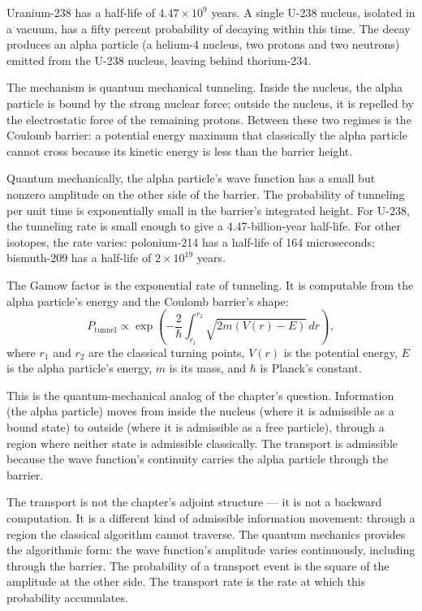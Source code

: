 Uranium-238 has a half-life of $4.47 \times 10^9$ years. A single
U-238 nucleus, isolated in a vacuum, has a fifty percent probability
of decaying within this time. The decay produces an alpha particle (a
helium-4 nucleus, two protons and two neutrons) emitted from the U-238
nucleus, leaving behind thorium-234.

The mechanism is quantum mechanical tunneling. Inside the nucleus,
the alpha particle is bound by the strong nuclear force; outside the
nucleus, it is repelled by the electrostatic force of the remaining
protons. Between these two regimes is the Coulomb barrier: a
potential energy maximum that classically the alpha particle cannot
cross because its kinetic energy is less than the barrier height.

Quantum mechanically, the alpha particle's wave function has a small
but nonzero amplitude on the other side of the barrier. The
probability of tunneling per unit time is exponentially small in the
barrier's integrated height. For U-238, the tunneling rate is small
enough to give a 4.47-billion-year half-life. For other isotopes,
the rate varies: polonium-214 has a half-life of 164 microseconds;
bismuth-209 has a half-life of $2 \times 10^{19}$ years.

The Gamow factor is the exponential rate of tunneling. It is
computable from the alpha particle's energy and the Coulomb
barrier's shape:
\[
P_{\text{tunnel}} \propto \exp\left(-\frac{2}{\hbar}
\int_{r_1}^{r_2} \sqrt{2m(V(r) - E)} \, dr\right),
\]
where $r_1$ and $r_2$ are the classical turning points, $V(r)$ is
the potential energy, $E$ is the alpha particle's energy, $m$ is its
mass, and $\hbar$ is Planck's constant.

This is the quantum-mechanical analog of the chapter's question.
Information (the alpha particle) moves from inside the nucleus
(where it is admissible as a bound state) to outside (where it is
admissible as a free particle), through a region where neither
state is admissible classically. The transport is admissible because
the wave function's continuity carries the alpha particle through
the barrier.

The transport is not the chapter's adjoint structure --- it is not
a backward computation. It is a different kind of admissible
information movement: through a region the classical algorithm
cannot traverse. The quantum mechanics provides the algorithmic
form: the wave function's amplitude varies continuously, including
through the barrier. The probability of a transport event is the
square of the amplitude at the other side. The transport rate is
the rate at which this probability accumulates.

